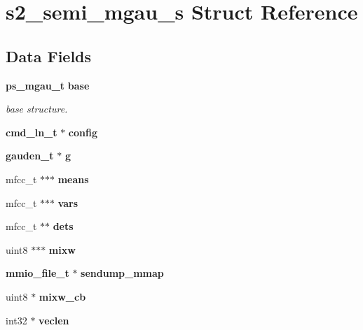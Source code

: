 \section{s2\-\_\-semi\-\_\-mgau\-\_\-s Struct Reference}
\label{structs2__semi__mgau__s}
\subsection*{Data Fields}
\begin{DoxyCompactItemize}
\item 
{\bf ps\-\_\-mgau\-\_\-t} {\bf base}
\begin{DoxyCompactList}\small\item\em base structure. \end{DoxyCompactList}\item 
{\bf cmd\-\_\-ln\-\_\-t} $\ast$ {\bfseries config}\label{structs2__semi__mgau__s_ababf1e9522fb14c351df9a6b6d3957bc}

\item 
{\bf gauden\-\_\-t} $\ast$ {\bfseries g}\label{structs2__semi__mgau__s_ab9d5d5dcafa40af8869ceabb60a8d35b}

\item 
mfcc\-\_\-t $\ast$$\ast$$\ast$ {\bfseries means}\label{structs2__semi__mgau__s_a22ebad1d9b3ffa6dad349cc3eec0b092}

\item 
mfcc\-\_\-t $\ast$$\ast$$\ast$ {\bfseries vars}\label{structs2__semi__mgau__s_a724a8e6bca376cbd091c1ab4ddeb43e0}

\item 
mfcc\-\_\-t $\ast$$\ast$ {\bfseries dets}\label{structs2__semi__mgau__s_ad93b0a6ed646349a2a81f88acbb535dd}

\item 
uint8 $\ast$$\ast$$\ast$ {\bfseries mixw}\label{structs2__semi__mgau__s_a1207b5db7e37e9477f3b55cc2d447050}

\item 
{\bf mmio\-\_\-file\-\_\-t} $\ast$ {\bfseries sendump\-\_\-mmap}\label{structs2__semi__mgau__s_a66a60126fe057d36640cbf69f916bca3}

\item 
uint8 $\ast$ {\bfseries mixw\-\_\-cb}\label{structs2__semi__mgau__s_a20ec32cb8c38fb48909b2cc7c5412c3b}

\item 
int32 $\ast$ {\bfseries veclen}\label{structs2__semi__mgau__s_a73331a6f5833db8cd4c8301ffe54be5e}


\end{DoxyCompactItemize}
